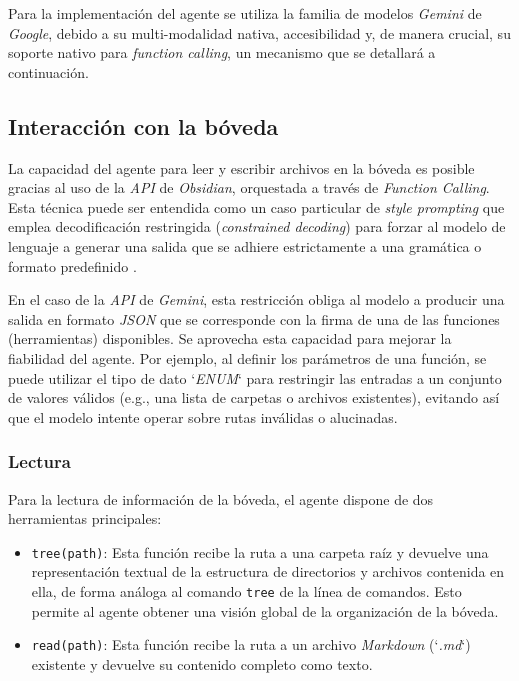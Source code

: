 Para la implementación del agente se utiliza la familia de modelos \textit{Gemini} de \textit{Google}, debido a su multi-modalidad nativa, accesibilidad y, de manera crucial, su soporte nativo para \textit{function calling}, un mecanismo que se detallará a continuación.

\subsection{Interacción con la bóveda}
La capacidad del agente para leer y escribir archivos en la bóveda es posible gracias al uso de la \textit{API} de \textit{Obsidian}, orquestada a través de \textit{Function Calling}. Esta técnica puede ser entendida como un caso particular de \textit{style prompting} que emplea decodificación restringida (\textit{constrained decoding}) para forzar al modelo de lenguaje a generar una salida que se adhiere estrictamente a una gramática o formato predefinido \parencite{gengGrammarConstrainedDecodingStructured2024}.

En el caso de la \textit{API} de \textit{Gemini}, esta restricción obliga al modelo a producir una salida en formato \textit{JSON} que se corresponde con la firma de una de las funciones (herramientas) disponibles. Se aprovecha esta capacidad para mejorar la fiabilidad del agente. Por ejemplo, al definir los parámetros de una función, se puede utilizar el tipo de dato `\textit{ENUM}` para restringir las entradas a un conjunto de valores válidos (e.g., una lista de carpetas o archivos existentes), evitando así que el modelo intente operar sobre rutas inválidas o alucinadas.

\subsubsection{Lectura}
Para la lectura de información de la bóveda, el agente dispone de dos herramientas principales:
\begin{itemize}
    \item \texttt{tree(path)}: Esta función recibe la ruta a una carpeta raíz y devuelve una representación textual de la estructura de directorios y archivos contenida en ella, de forma análoga al comando \texttt{tree} de la línea de comandos. Esto permite al agente obtener una visión global de la organización de la bóveda.
    \item \texttt{read(path)}: Esta función recibe la ruta a un archivo \textit{Markdown} (`\textit{.md}`) existente y devuelve su contenido completo como texto.
\end{itemize}
 
